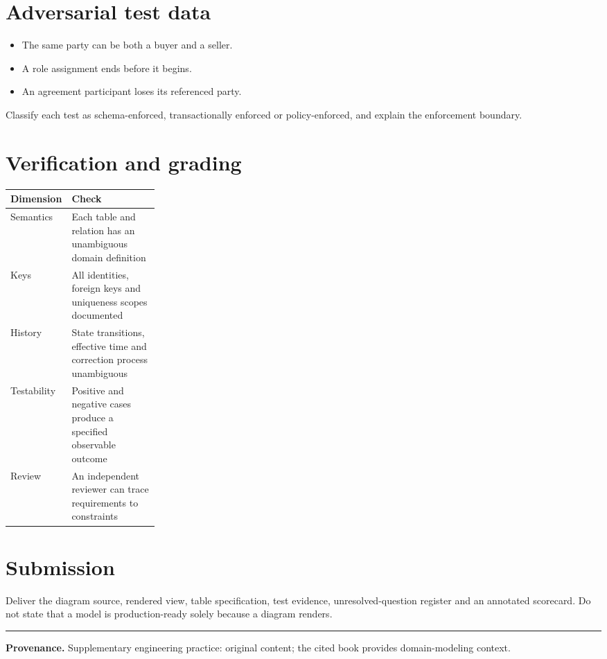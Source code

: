 \documentclass[11pt,letterpaper]{article}
\begin{document}
\section{Adversarial test data}
\begin{itemize}
\item The same party can be both a buyer and a seller.
\item A role assignment ends before it begins.
\item An agreement participant loses its referenced party.
\end{itemize}
Classify each test as schema-enforced, transactionally enforced or policy-enforced, and explain the enforcement boundary.


\section{Verification and grading}
\begin{tabularx}{\linewidth}{@{}>{\raggedright\arraybackslash}p{0.25\linewidth}>{\raggedright\arraybackslash}X@{}}
\toprule
\textbf{Dimension} & \textbf{Check} \\ 
\midrule
Semantics & Each table and relation has an unambiguous domain definition \\ 
Keys & All identities, foreign keys and uniqueness scopes documented \\ 
History & State transitions, effective time and correction process unambiguous \\ 
Testability & Positive and negative cases produce a specified observable outcome \\ 
Review & An independent reviewer can trace requirements to constraints \\ 
\bottomrule
\end{tabularx}

\section{Submission}
Deliver the diagram source, rendered view, table specification, test evidence, unresolved-question register and an annotated scorecard. Do not state that a model is production-ready solely because a diagram renders.


\vfill
\hrule
{\footnotesize\textbf{Provenance.} Supplementary engineering practice: original content; the cited book provides domain-modeling context.}
\end{document}
